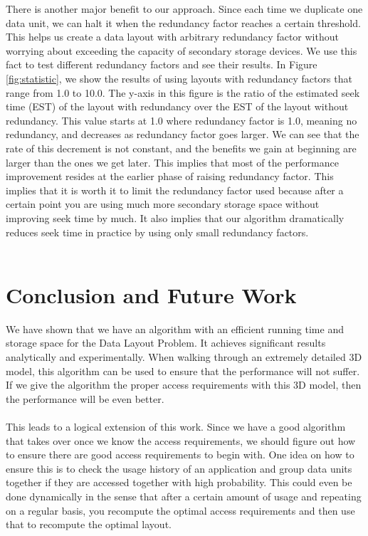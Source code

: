 \documentclass[conference]{acmsiggraph}
\begin{document}
There is another major benefit to our approach. Since each time we duplicate one data unit, we can halt it when the redundancy factor reaches a certain threshold. This helps us create a data layout with arbitrary redundancy factor without worrying about exceeding the capacity of secondary storage devices. We use this fact to test different redundancy factors and see their results. In Figure \ref{fig:statistic}, we show the results of using layouts with redundancy factors that range from 1.0 to 10.0. The y-axis in this figure is the ratio of the estimated seek time (EST) of the layout with redundancy over the EST of the layout without redundancy. This value starts at 1.0 where redundancy factor is 1.0, meaning no redundancy, and decreases as redundancy factor goes larger. We can see that the rate of this decrement is not constant, and the benefits we gain at beginning are larger than the ones we get later. This implies that most of the performance improvement resides at the earlier phase of raising redundancy factor. This implies that it is worth it to limit the redundancy factor used because after a certain point you are using much more secondary storage space without improving seek time by much. It also implies that our algorithm dramatically reduces seek time in practice by using only small redundancy factors. \\  
\\


\section{Conclusion and Future Work}

We have shown that we have an algorithm with an efficient running time and storage space for the Data Layout Problem. It achieves significant results analytically and experimentally. When walking through an extremely detailed 3D model, this algorithm can be used to ensure that the performance will not suffer. If we give the algorithm the proper access requirements with this 3D model, then the performance will be even better.\\
\\
This leads to a logical extension of this work. Since we have a good algorithm that takes over once we know the access requirements, we should figure out how to ensure there are good access requirements to begin with. One idea on how to ensure this is to check the usage history of an application and group data units together if they are accessed together with high probability. This could even be done dynamically in the sense that after a certain amount of usage and repeating on a regular basis, you recompute the optimal access requirements and then use that to recompute the optimal layout. 



\end{document}
